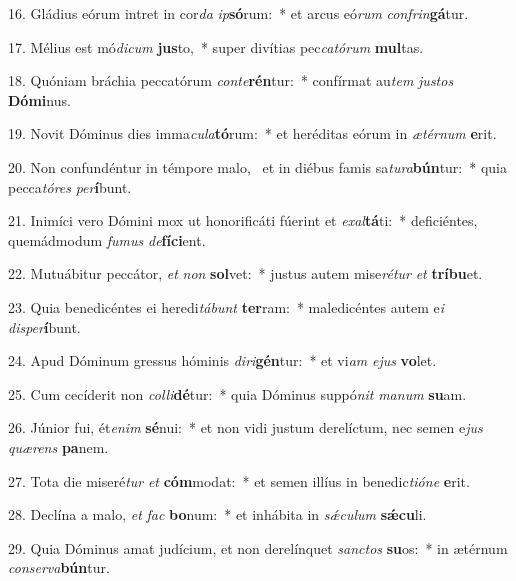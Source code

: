 16. Gládius eórum intret in cor\textit{da} \textit{ip}\textbf{só}rum:~*  et arcus eó\textit{rum} \textit{con}\textit{frin}\textbf{gá}tur.\

17. Mélius est mó\textit{di}\textit{cum} \textbf{jus}to,~*  super divítias pec\textit{ca}\textit{tó}\textit{rum} \textbf{mul}tas.\

18. Quóniam bráchia peccatórum \textit{con}\textit{te}\textbf{rén}tur:~*  confírmat au\textit{tem} \textit{jus}\textit{tos} \textbf{Dó}\textbf{mi}nus.\

19. Novit Dóminus dies imma\textit{cu}\textit{la}\textbf{tó}rum:~*  et heréditas eórum in \textit{æ}\textit{tér}\textit{num} \textbf{e}rit.\

20. Non confundéntur in témpore malo, \dag\  et in diébus famis sa\textit{tu}\textit{ra}\textbf{bún}tur:~*  quia pecca\textit{tó}\textit{res} \textit{per}\textbf{í}bunt.\

21. Inimíci vero Dómini mox ut honorificáti fúerint et \textit{ex}\textit{al}\textbf{tá}ti:~*  deficiéntes, quemádmodum \textit{fu}\textit{mus} \textit{de}\textbf{fí}\textbf{ci}ent.\

22. Mutuábitur peccátor, \textit{et} \textit{non} \textbf{sol}vet:~*  justus autem mise\textit{ré}\textit{tur} \textit{et} \textbf{trí}\textbf{bu}et.\

23. Quia benedicéntes ei heredi\textit{tá}\textit{bunt} \textbf{ter}ram:~*  maledicéntes autem e\textit{i} \textit{dis}\textit{per}\textbf{í}bunt.\

24. Apud Dóminum gressus hóminis \textit{di}\textit{ri}\textbf{gén}tur:~*  et vi\textit{am} \textit{e}\textit{jus} \textbf{vo}let.\

25. Cum cecíderit non \textit{col}\textit{li}\textbf{dé}tur:~*  quia Dóminus suppó\textit{nit} \textit{ma}\textit{num} \textbf{su}am.\

26. Júnior fui, ét\textit{e}\textit{nim} \textbf{sé}nui:~*  et non vidi justum derelíctum, nec semen e\textit{jus} \textit{quæ}\textit{rens} \textbf{pa}nem.\

27. Tota die miseré\textit{tur} \textit{et} \textbf{cóm}modat:~*  et semen illíus in benedic\textit{ti}\textit{ó}\textit{ne} \textbf{e}rit.\

28. Declína a malo, \textit{et} \textit{fac} \textbf{bo}num:~*  et inhábita in \textit{sǽ}\textit{cu}\textit{lum} \textbf{sǽ}\textbf{cu}li.\

29. Quia Dóminus amat judícium, et non derelínquet \textit{sanc}\textit{tos} \textbf{su}os:~*  in ætérnum \textit{con}\textit{ser}\textit{va}\textbf{bún}tur.\

